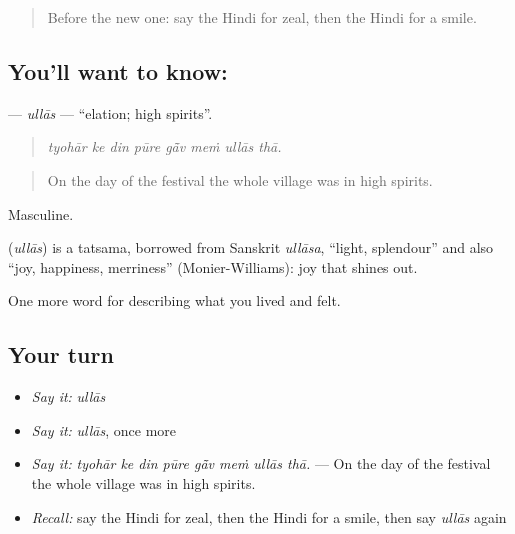 \label{lesson:HI-C453-ullas}



\begin{quote}
Before the new one: say the Hindi for zeal, then the Hindi for a smile.
\end{quote}

\subsection*{You'll want to know: }
\textbf{} — \emph{ullās} — \textquotedblleft{}elation; high spirits\textquotedblright{}.

\begin{quote}
       
\end{quote}

\begin{quote}
\emph{tyohār ke din pūre gā̃v meṁ ullās thā.}
\end{quote}

\begin{quote}
On the day of the festival the whole village was in high spirits.
\end{quote}

Masculine.

\begin{cousinweb}
\textbf{} (\emph{ullās}) is a tatsama, borrowed from Sanskrit \emph{ullāsa}, \textquotedblleft{}light, splendour\textquotedblright{} and also \textquotedblleft{}joy, happiness, merriness\textquotedblright{} (Monier-Williams): joy that shines out.
\end{cousinweb}

\begin{grammarlens}[title={What you've built}]
One more word for describing what you lived and felt.
\end{grammarlens}

\subsection*{Your turn}
\begin{itemize}
\raggedright
  \item \emph{Say it:} \emph{ullās}
  \item \emph{Say it:} \emph{ullās}, once more
  \item \emph{Say it:} \emph{tyohār ke din pūre gā̃v meṁ ullās thā.} — On the day of the festival the whole village was in high spirits.
  \item \emph{Recall:} say the Hindi for zeal, then the Hindi for a smile, then say \emph{ullās} again
\end{itemize}

